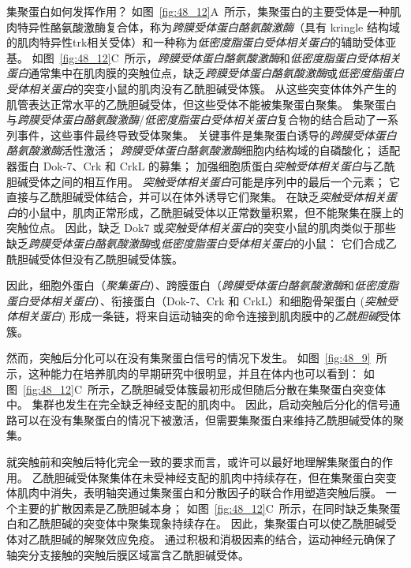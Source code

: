 集聚蛋白如何发挥作用？
如图~\ref{fig:48_12}A~所示，集聚蛋白的主要受体是一种肌肉特异性酪氨酸激酶复合体，称为\textit{跨膜受体蛋白酪氨酸激酶}（具有 kringle 结构域的肌肉特异性trk相关受体）和一种称为\textit{低密度脂蛋白受体相关蛋白}的辅助受体亚基。
如图~\ref{fig:48_12}C~所示，\textit{跨膜受体蛋白酪氨酸激酶}和\textit{低密度脂蛋白受体相关蛋白}通常集中在肌肉膜的突触位点，缺乏\textit{跨膜受体蛋白酪氨酸激酶}或\textit{低密度脂蛋白受体相关蛋白}的突变小鼠的肌肉没有乙酰胆碱受体簇。
从这些突变体体外产生的肌管表达正常水平的乙酰胆碱受体，但这些受体不能被集聚蛋白聚集。
集聚蛋白与\textit{跨膜受体蛋白酪氨酸激酶}/\textit{低密度脂蛋白受体相关蛋白}复合物的结合启动了一系列事件，这些事件最终导致受体聚集。
关键事件是集聚蛋白诱导的\textit{跨膜受体蛋白酪氨酸激酶}活性激活；
\textit{跨膜受体蛋白酪氨酸激酶}细胞内结构域的自磷酸化；
适配器蛋白 Dok-7、Crk 和 CrkL 的募集；
加强细胞质蛋白\textit{突触受体相关蛋白}与乙酰胆碱受体之间的相互作用。
\textit{突触受体相关蛋白}可能是序列中的最后一个元素；
它直接与乙酰胆碱受体结合，并可以在体外诱导它们聚集。
在缺乏\textit{突触受体相关蛋白}的小鼠中，肌肉正常形成，乙酰胆碱受体以正常数量积累，但不能聚集在膜上的突触位点。
因此，缺乏 Dok7 或\textit{突触受体相关蛋白}的突变小鼠的肌肉类似于那些缺乏\textit{跨膜受体蛋白酪氨酸激酶}或\textit{低密度脂蛋白受体相关蛋白}的小鼠：
它们合成乙酰胆碱受体但没有乙酰胆碱受体簇。


因此，细胞外蛋白（\textit{聚集蛋白}）、跨膜蛋白（\textit{跨膜受体蛋白酪氨酸激酶}和\textit{低密度脂蛋白受体相关蛋白}）、衔接蛋白（Dok-7、Crk 和 CrkL）和细胞骨架蛋白 (\textit{突触受体相关蛋白}) 形成一条链，将来自运动轴突的命令连接到肌肉膜中的\textit{乙酰胆碱}受体簇。


然而，突触后分化可以在没有集聚蛋白信号的情况下发生。
如图~\ref{fig:48_9}~所示，这种能力在培养肌肉的早期研究中很明显，并且在体内也可以看到：
如图~\ref{fig:48_12}C~所示，乙酰胆碱受体簇最初形成但随后分散在集聚蛋白突变体中。
集群也发生在完全缺乏神经支配的肌肉中。
因此，启动突触后分化的信号通路可以在没有集聚蛋白的情况下被激活，但需要集聚蛋白来维持乙酰胆碱受体的聚集。


就突触前和突触后特化完全一致的要求而言，或许可以最好地理解集聚蛋白的作用。
乙酰胆碱受体聚集体在未受神经支配的肌肉中持续存在，但在集聚蛋白突变体肌肉中消失，表明轴突通过集聚蛋白和分散因子的联合作用塑造突触后膜。
一个主要的扩散因素是乙酰胆碱本身；
如图~\ref{fig:48_12}C~所示，在同时缺乏集聚蛋白和乙酰胆碱的突变体中聚集现象持续存在。
因此，集聚蛋白可以使乙酰胆碱受体对乙酰胆碱的解聚效应免疫。
通过积极和消极因素的结合，运动神经元确保了轴突分支接触的突触后膜区域富含乙酰胆碱受体。



